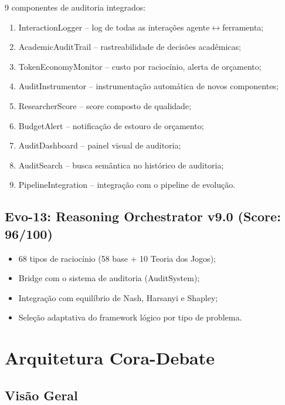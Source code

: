 \documentclass[12pt,a4paper,sumario=tradicional]{abntex2}
\begin{document}
9 componentes de auditoria integrados:
\begin{enumerate}
    \item InteractionLogger -- log de todas as interações agente$\leftrightarrow$ferramenta;
    \item AcademicAuditTrail -- rastreabilidade de decisões acadêmicas;
    \item TokenEconomyMonitor -- custo por raciocínio, alerta de orçamento;
    \item AuditInstrumentor -- instrumentação automática de novos componentes;
    \item ResearcherScore -- score composto de qualidade;
    \item BudgetAlert -- notificação de estouro de orçamento;
    \item AuditDashboard -- painel visual de auditoria;
    \item AuditSearch -- busca semântica no histórico de auditoria;
    \item PipelineIntegration -- integração com o pipeline de evolução.
\end{enumerate}

\section{Evo-13: Reasoning Orchestrator v9.0 (Score: 96/100)}

\begin{itemize}
    \item 68 tipos de raciocínio (58 base + 10 Teoria dos Jogos);
    \item Bridge com o sistema de auditoria (AuditSystem);
    \item Integração com equilíbrio de Nash, Harsanyi e Shapley;
    \item Seleção adaptativa do framework lógico por tipo de problema.
\end{itemize}

\chapter{Arquitetura Cora-Debate}

\section{Visão Geral}
\end{document}
